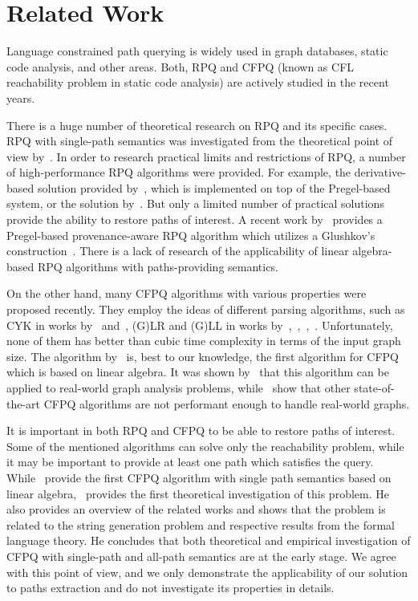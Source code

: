 \section{Related Work}

Language constrained path querying is widely used in graph databases, static code analysis, and other areas.
Both, RPQ and CFPQ (known as CFL reachability problem in static code analysis) are actively studied in the recent years.

There is a huge number of theoretical research on RPQ and its specific cases.
RPQ with single-path semantics was investigated from the theoretical point of view by~\cite{barrett2000formal}.
In order to research practical limits and restrictions of RPQ, a number of high-performance RPQ algorithms were provided.
For example, the derivative-based solution provided by~\cite{10.1145/2949689.2949711}, which is implemented on top of the Pregel-based system, or the solution by~\cite{10.1007/978-3-642-31235-9_12}.
But only a limited number of practical solutions provide the ability to restore paths of interest.
A recent work by~\cite{Wang2019} provides a Pregel-based provenance-aware RPQ algorithm which utilizes a Glushkov's construction~\citep{Glushkov1961}.
There is a lack of research of the applicability of linear algebra-based RPQ algorithms with paths-providing semantics.

On the other hand, many CFPQ algorithms with various properties were proposed recently.
They employ the ideas of different parsing algorithms, such as CYK in works by~\cite{hellingsRelational} and~\cite{8249039}, (G)LR and (G)LL in works by~\cite{10.1007/978-3-319-41579-6_22},~\cite{Grigorev:2017:CPQ:3166094.3166104},~\cite{10.1007/978-3-319-91662-0_17},~\cite{Medeiros:2018:EEC:3167132.3167265}.
Unfortunately, none of them has better than cubic time complexity in terms of the input graph size.
The algorithm by~\cite{Azimov:2018:CPQ:3210259.3210264} is, best to our knowledge, the first algorithm for CFPQ which is based on linear algebra.
It was shown by~\cite{10.1145/3398682.3399163} that this algorithm can be applied to real-world graph analysis problems, while~\cite{Kuijpers:2019:ESC:3335783.3335791} show that other state-of-the-art CFPQ algorithms are not performant enough to handle real-world graphs.

It is important in both RPQ and CFPQ to be able to restore paths of interest.
Some of the mentioned algorithms can solve only the reachability problem, while it may be important to provide at least one path which satisfies the query.
While~\cite{10.1145/3398682.3399163} provide the first CFPQ algorithm with single path semantics based on linear algebra,~\cite{HellSinglePath} provides the first theoretical investigation of this problem.
He also provides an overview of the related works and shows that the problem is related to the string generation problem and respective results from the formal language theory.
He concludes that both theoretical and empirical investigation of CFPQ with single-path and all-path semantics are at the early stage.
We agree with this point of view, and we only demonstrate the applicability of our solution to paths extraction and do not investigate its properties in details.

